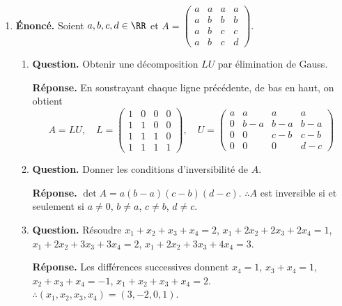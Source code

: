 \documentclass[12pt, a4paper]{article}
\begin{document}
\begin{enumerate}[label=4.\arabic*., start=60]
\begin{minipage}[t]{\linewidth}
\begin{enumerate}[\arabic*.]
\end{enumerate}
\end{minipage}

  \item \begin{minipage}[t]{\linewidth}\raggedright
\textbf{Énoncé.} Soient $a,b,c,d\in\RR$ et $\displaystyle A=\begin{pmatrix}a&a&a&a\\a&b&b&b\\a&b&c&c\\a&b&c&d\end{pmatrix}$.

\begin{enumerate}[\arabic*.]
        \item \textbf{Question.} Obtenir une décomposition $LU$ par élimination de Gauss.
\par\smallskip
\textbf{Réponse.} En soustrayant chaque ligne précédente, de bas en haut, on obtient
        \[
          A=LU,\quad L=\begin{pmatrix}1&0&0&0\\1&1&0&0\\1&1&1&0\\1&1&1&1\end{pmatrix},\quad
          U=\begin{pmatrix}a&a&a&a\\0&b-a&b-a&b-a\\0&0&c-b&c-b\\0&0&0&d-c\end{pmatrix}
        \]

  \item \textbf{Question.} Donner les conditions d’inversibilité de $A$.
\par\smallskip
\textbf{Réponse.} $\det A=a(b-a)(c-b)(d-c)$.
        $\therefore A$ est inversible si et seulement si $a\neq0$, $b\neq a$, $c\neq b$, $d\neq c$.

  \item \textbf{Question.} Résoudre $x_1+x_2+x_3+x_4=2$, $x_1+2x_2+2x_3+2x_4=1$, $x_1+2x_2+3x_3+3x_4=2$, $x_1+2x_2+3x_3+4x_4=3$.
\par\smallskip
\textbf{Réponse.} Les différences successives donnent
        $x_4=1$, $x_3+x_4=1$, $x_2+x_3+x_4=-1$, $x_1+x_2+x_3+x_4=2$.
        $\therefore (x_1,x_2,x_3,x_4)=(3,-2,0,1)$.

\end{enumerate}
\end{minipage}


\end{enumerate}
\end{document}
